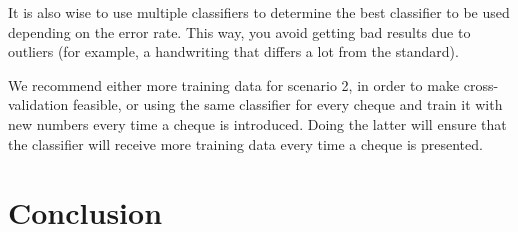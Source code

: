 \documentclass[11pt,twoside,a4paper]{article}
\begin{document}
It is also wise to use multiple classifiers to determine the best classifier to be used depending on the error rate. This way, you avoid getting bad results due to outliers (for example, a handwriting that differs a lot from the standard).

We recommend either more training data for scenario 2, in order to make cross-validation feasible, or using the same classifier for every cheque and train it with new numbers every time a cheque is introduced. Doing the latter will ensure that the classifier will receive more training data every time a cheque is presented.

\section{Conclusion}

\newpage



\end{document}
